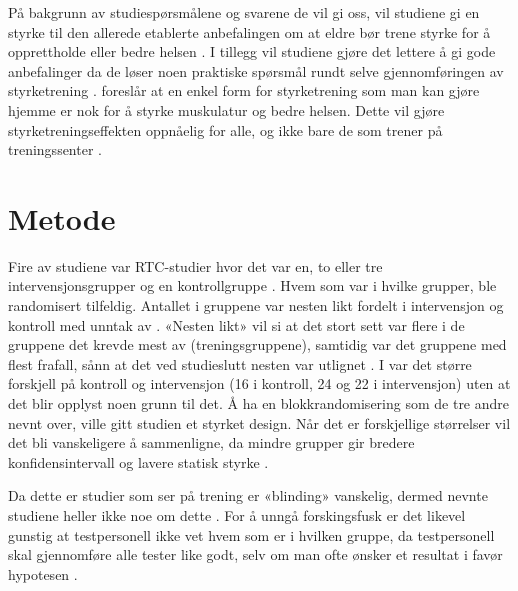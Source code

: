 \documentclass[
]{book}
\begin{document}
På bakgrunn av studiespørsmålene og svarene de vil gi oss, vil studiene gi en styrke til den allerede etablerte anbefalingen om at eldre bør trene styrke for å opprettholde eller bedre helsen \citep[ \citet{vincent2002}]{geirsdottir2012, schott2019, turpela2017, vikberg2019}. I tillegg vil studiene gjøre det lettere å gi gode anbefalinger da de løser noen praktiske spørsmål rundt selve gjennomføringen av styrketrening \citetext{\citealp[ ]{geirsdottir2012}; \citealp{schott2019}; \citealp{turpela2017}; \citealp{vikberg2019}; \citealp{vincent2002}}. \citet{vikberg2019} foreslår at en enkel form for styrketrening som man kan gjøre hjemme er nok for å styrke muskulatur og bedre helsen. Dette vil gjøre styrketreningseffekten oppnåelig for alle, og ikke bare de som trener på treningssenter \citep{vikberg2019}.

\hypertarget{metode-1}{%
\section{Metode}\label{metode-1}}

Fire av studiene var RTC-studier hvor det var en, to eller tre intervensjonsgrupper og en kontrollgruppe \citep{schott2019, turpela2017, vikberg2019, vincent2002}. Hvem som var i hvilke grupper, ble randomisert tilfeldig. Antallet i gruppene var nesten likt fordelt i intervensjon og kontroll med unntak av \citet{vincent2002} . «Nesten likt» vil si at det stort sett var flere i de gruppene det krevde mest av (treningsgruppene), samtidig var det gruppene med flest frafall, sånn at det ved studieslutt nesten var utlignet \citep{schott2019, turpela2017, vikberg2019}. I \citet{vincent2002} var det større forskjell på kontroll og intervensjon (16 i kontroll, 24 og 22 i intervensjon) uten at det blir opplyst noen grunn til det. Å ha en blokkrandomisering som de tre andre nevnt over, ville gitt studien et styrket design. Når det er forskjellige størrelser vil det bli vanskeligere å sammenligne, da mindre grupper gir bredere konfidensintervall og lavere statisk styrke \citep[s. 63, 146]{hulley2013}.

Da dette er studier som ser på trening er «blinding» vanskelig, dermed nevnte studiene heller ikke noe om dette \citep{geirsdottir2012, schott2019, turpela2017, vikberg2019, vincent2002}. For å unngå forskingsfusk er det likevel gunstig at testpersonell ikke vet hvem som er i hvilken gruppe, da testpersonell skal gjennomføre alle tester like godt, selv om man ofte ønsker et resultat i favør hypotesen \citep[s. 148-149]{hulley2013}.
\end{document}
